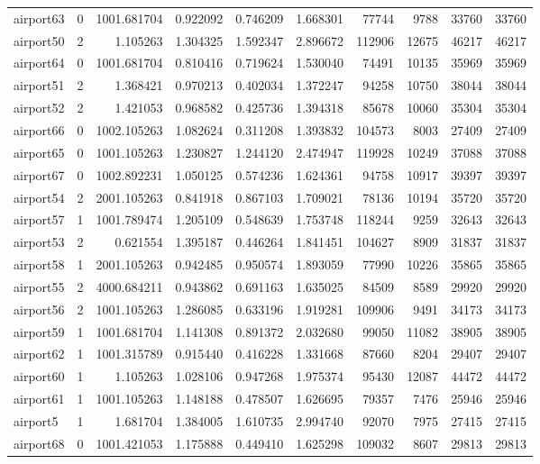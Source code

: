 \begin{longtable}{|l|r|r|r|r|r|r|r|r|r|}
airport63 & 0 & 1001.681704 & 0.922092 & 0.746209 & 1.668301 & 77744 & 9788 & 33760 & 33760 \\
airport50 & 2 & 1.105263 & 1.304325 & 1.592347 & 2.896672 & 112906 & 12675 & 46217 & 46217 \\
airport64 & 0 & 1001.681704 & 0.810416 & 0.719624 & 1.530040 & 74491 & 10135 & 35969 & 35969 \\
airport51 & 2 & 1.368421 & 0.970213 & 0.402034 & 1.372247 & 94258 & 10750 & 38044 & 38044 \\
airport52 & 2 & 1.421053 & 0.968582 & 0.425736 & 1.394318 & 85678 & 10060 & 35304 & 35304 \\
airport66 & 0 & 1002.105263 & 1.082624 & 0.311208 & 1.393832 & 104573 & 8003 & 27409 & 27409 \\
airport65 & 0 & 1001.105263 & 1.230827 & 1.244120 & 2.474947 & 119928 & 10249 & 37088 & 37088 \\
airport67 & 0 & 1002.892231 & 1.050125 & 0.574236 & 1.624361 & 94758 & 10917 & 39397 & 39397 \\
airport54 & 2 & 2001.105263 & 0.841918 & 0.867103 & 1.709021 & 78136 & 10194 & 35720 & 35720 \\
airport57 & 1 & 1001.789474 & 1.205109 & 0.548639 & 1.753748 & 118244 & 9259 & 32643 & 32643 \\
airport53 & 2 & 0.621554 & 1.395187 & 0.446264 & 1.841451 & 104627 & 8909 & 31837 & 31837 \\
airport58 & 1 & 2001.105263 & 0.942485 & 0.950574 & 1.893059 & 77990 & 10226 & 35865 & 35865 \\
airport55 & 2 & 4000.684211 & 0.943862 & 0.691163 & 1.635025 & 84509 & 8589 & 29920 & 29920 \\
airport56 & 2 & 1001.105263 & 1.286085 & 0.633196 & 1.919281 & 109906 & 9491 & 34173 & 34173 \\
airport59 & 1 & 1001.681704 & 1.141308 & 0.891372 & 2.032680 & 99050 & 11082 & 38905 & 38905 \\
airport62 & 1 & 1001.315789 & 0.915440 & 0.416228 & 1.331668 & 87660 & 8204 & 29407 & 29407 \\
airport60 & 1 & 1.105263 & 1.028106 & 0.947268 & 1.975374 & 95430 & 12087 & 44472 & 44472 \\
airport61 & 1 & 1001.105263 & 1.148188 & 0.478507 & 1.626695 & 79357 & 7476 & 25946 & 25946 \\
airport5 & 1 & 1.681704 & 1.384005 & 1.610735 & 2.994740 & 92070 & 7975 & 27415 & 27415 \\
airport68 & 0 & 1001.421053 & 1.175888 & 0.449410 & 1.625298 & 109032 & 8607 & 29813 & 29813 \\

\end{longtable}
